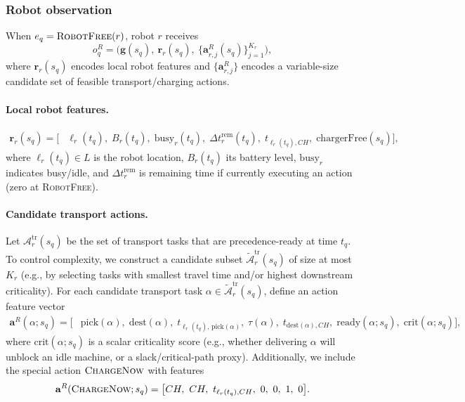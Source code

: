 \documentclass[preprint, 3p, review, 12pt]{elsarticle}
\begin{document}
\subsubsection{Robot observation}
When $e_q=\textsc{RobotFree}(r)$, robot $r$ receives
\[
o_q^{R} = \Big(\mathbf{g}(s_q),\ \mathbf{r}_r(s_q),\ \{\mathbf{a}^{R}_{r,j}(s_q)\}_{j=1}^{K_r}\Big),
\]
where $\mathbf{r}_r(s_q)$ encodes local robot features and $\{\mathbf{a}^{R}_{r,j}\}$ encodes a variable-size
candidate set of feasible transport/charging actions.

\paragraph{Local robot features.}
\begin{align}
\mathbf{r}_r(s_q)=
\Big[
&\ell_r(t_q),\;
B_r(t_q),\;
\mathrm{busy}_r(t_q),\;
\Delta t^{\mathrm{rem}}_r(t_q),\;
t_{\ell_r(t_q),CH},\;
\mathrm{chargerFree}(s_q)
\Big],
\label{eq:robot_feat}
\end{align}
where $\ell_r(t_q)\in L$ is the robot location, $B_r(t_q)$ its battery level, $\mathrm{busy}_r$ indicates busy/idle,
and $\Delta t_r^{\mathrm{rem}}$ is remaining time if currently executing an action (zero at \textsc{RobotFree}).

\paragraph{Candidate transport actions.}
Let $\mathcal{A}_r^{\mathrm{tr}}(s_q)$ be the set of transport tasks that are precedence-ready at time $t_q$.
To control complexity, we construct a candidate subset $\tilde{\mathcal{A}}_r^{\mathrm{tr}}(s_q)$ of size at most $K_r$
(e.g., by selecting tasks with smallest travel time and/or highest downstream criticality).
For each candidate transport task $\alpha\in \tilde{\mathcal{A}}_r^{\mathrm{tr}}(s_q)$, define an action feature vector
\begin{align}
\mathbf{a}^{R}(\alpha;s_q)=
\Big[
&\mathrm{pick}(\alpha),\;
\mathrm{dest}(\alpha),\;
t_{\ell_r(t_q),\,\mathrm{pick}(\alpha)},\;
\tau(\alpha),\;
t_{\mathrm{dest}(\alpha),CH},\;
\mathrm{ready}(\alpha;s_q),\;
\mathrm{crit}(\alpha;s_q)
\Big],
\label{eq:robot_action_feat}
\end{align}
where $\mathrm{crit}(\alpha;s_q)$ is a scalar criticality score (e.g., whether delivering $\alpha$ will unblock an idle machine,
or a slack/critical-path proxy).
Additionally, we include the special action $\textsc{ChargeNow}$ with features
\[
\mathbf{a}^{R}(\textsc{ChargeNow};s_q)=\big[CH,\ CH,\ t_{\ell_r(t_q),CH},\ 0,\ 0,\ 1,\ 0\big].
\]
\end{document}
